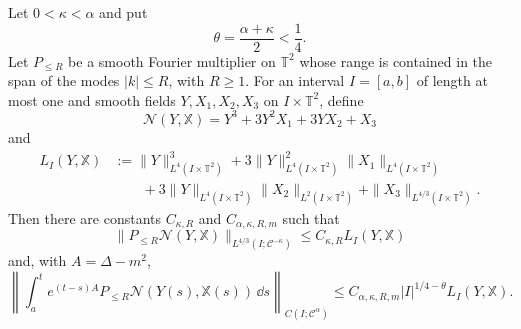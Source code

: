 \begin{proposition}
\label{prop:spde-dpd-energy-low-mode-forcing}
Let \(0<\kappa<\alpha\) and put
\[
  \theta=\frac{\alpha+\kappa}{2}<\frac14 .
\]
Let \(P_{\leq R}\) be a smooth Fourier multiplier on \(\mathbb T^2\) whose
range is contained in the span of the modes \(|k|\leq R\), with \(R\geq1\).
For an interval \(I=[a,b]\) of length at most one and smooth fields
\(Y,X_1,X_2,X_3\) on \(I\times\mathbb T^2\), define
\[
  \mathcal N(Y,\mathbb X)
  =
  Y^3+3Y^2X_1+3YX_2+X_3
\]
and
\[
\begin{aligned}
  L_I(Y,\mathbb X)
  &:=
  \|Y\|_{L^4(I\times\mathbb T^2)}^3
  +3\|Y\|_{L^4(I\times\mathbb T^2)}^2
     \|X_1\|_{L^4(I\times\mathbb T^2)}
\\
  &\qquad
  +3\|Y\|_{L^4(I\times\mathbb T^2)}
     \|X_2\|_{L^2(I\times\mathbb T^2)}
  +\|X_3\|_{L^{4/3}(I\times\mathbb T^2)} .
\end{aligned}
\]
Then there are constants \(C_{\kappa,R}\) and
\(C_{\alpha,\kappa,R,m}\) such that
\begin{equation}
  \|P_{\leq R}\mathcal N(Y,\mathbb X)\|_
    {L^{4/3}(I;\mathcal C^{-\kappa})}
  \leq
  C_{\kappa,R}L_I(Y,\mathbb X)
  \label{eq:spde-low-mode-forcing-l43}
\end{equation}
and, with \(A=\Delta-m^2\),
\begin{equation}
  \left\|
    \int_a^t e^{(t-s)A}
      P_{\leq R}\mathcal N(Y(s),\mathbb X(s))\,\dd s
  \right\|_{C(I;\mathcal C^\alpha)}
  \leq
  C_{\alpha,\kappa,R,m}
  |I|^{1/4-\theta}L_I(Y,\mathbb X).
  \label{eq:spde-low-mode-forcing-duhamel}
\end{equation}
\end{proposition}

